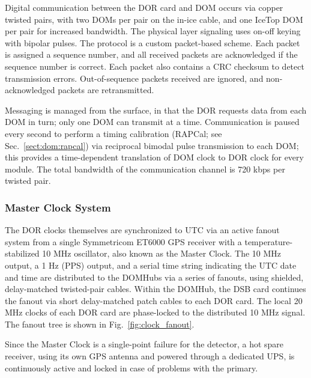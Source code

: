 Digital communication between the DOR card and DOM occurs via copper
twisted pairs, with two DOMs per pair on the in-ice cable, and one IceTop
DOM per pair for increased bandwidth.  The physical layer signaling
uses on-off keying with bipolar pulses.  The protocol is a custom
packet-based scheme.  Each packet is assigned a sequence number, and all
received packets are acknowledged if the sequence number is correct.  Each
packet also contains a CRC checksum to detect transmission errors.
Out-of-sequence packets received are ignored, and non-acknowledged packets
are retransmitted.

Messaging is managed from the surface, in that the DOR requests data from
each DOM in turn; only one DOM can transmit at a time.  Communication is
paused every second to perform a timing calibration (RAPCal; see
Sec.~\ref{sect:dom:rapcal}) via reciprocal bimodal pulse transmission to
each DOM; this provides a time-dependent translation of DOM clock to DOR
clock for every module.  The total bandwidth of the communication channel
is 720 kbps per twisted pair.


\subsubsection{\label{sect:online:master_clock}Master Clock System}

The DOR clocks themselves are synchronized to UTC via an active fanout
system from a single Symmetricom ET6000 GPS receiver with a
temperature-stabilized 10 MHz oscillator, also known as the Master Clock.
The 10 MHz output, a 1 Hz (PPS) output, and a serial time string indicating
the UTC date and time are distributed to the DOMHubs via a series of
fanouts, using shielded, delay-matched twisted-pair cables.  Within the
DOMHub, the DSB card continues the fanout via short delay-matched patch
cables to each DOR card.  The local 20 MHz clocks of each DOR card are
phase-locked to the distributed 10 MHz signal.  The fanout tree is shown in
Fig.~\ref{fig:clock_fanout}.

Since the Master Clock is a single-point failure for the detector, a
hot spare receiver, using its own GPS antenna and powered through a
dedicated UPS, is continuously active and locked in case of problems with
the primary.

